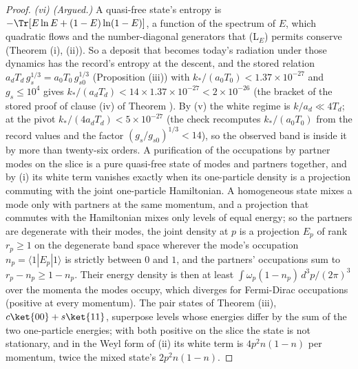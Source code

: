 \begin{proof}
\emph{(vi) (Argued.)} A quasi-free state's entropy is $-\Tr[E\ln E + (1 - E)\ln(1 - E)]$, a function of the spectrum of $E$, which quadratic flows and the number-diagonal generators that (L$_{E}$) permits conserve (Theorem (i), (ii)). So a deposit that becomes today's radiation under those dynamics has the record's entropy at the descent, and the stored relation $a_{d}T_{d}\,g_{s}^{1/3} = a_{0}T_{0}\,g_{s0}^{1/3}$ (Proposition (iii)) with $k_{*}/(a_{0}T_{0}) < 1.37 \times 10^{-27}$ and $g_{s} \le 10^{4}$ gives $k_{*}/(a_{d}T_{d}) < 14 \times 1.37 \times 10^{-27} < 2 \times 10^{-26}$ (the bracket of the stored proof of clause (iv) of Theorem ). By (v) the white regime is $k/a_{d} \ll 4T_{d}$; at the pivot $k_{*}/(4a_{d}T_{d}) < 5 \times 10^{-27}$ (the check recomputes $k_{*}/(a_{0}T_{0})$ from the record values and the factor $(g_{s}/g_{s0})^{1/3} < 14$), so the observed band is inside it by more than twenty-six orders. A purification of the occupations by partner modes on the slice is a pure quasi-free state of modes and partners together, and by (i) its white term vanishes exactly when its one-particle density is a projection commuting with the joint one-particle Hamiltonian. A homogeneous state mixes a mode only with partners at the same momentum, and a projection that commutes with the Hamiltonian mixes only levels of equal energy; so the partners are degenerate with their modes, the joint density at $p$ is a projection $E_{p}$ of rank $r_{p} \ge 1$ on the degenerate band space wherever the mode's occupation $n_{p} = \langle 1|E_{p}|1\rangle$ is strictly between $0$ and $1$, and the partners' occupations sum to $r_{p} - n_{p} \ge 1 - n_{p}$. Their energy density is then at least $\int\omega_{p}(1 - n_{p})\,d^{3}p/(2\pi)^{3}$ over the momenta the modes occupy, which diverges for Fermi-Dirac occupations (positive at every momentum). The pair states of Theorem (iii), $c\ket{00} + s\ket{11}$, superpose levels whose energies differ by the sum of the two one-particle energies; with both positive on the slice the state is not stationary, and in the Weyl form of (ii) its white term is $4p^{2}n(1 - n)$ per momentum, twice the mixed state's $2p^{2}n(1 - n)$.
\end{proof}
